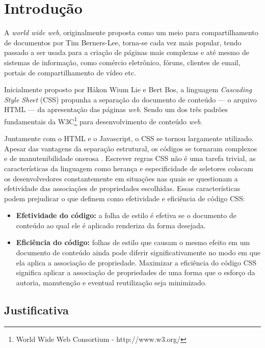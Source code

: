 \chapter{Introdução}
\label{chap:Intr}
A \textit{world wide web}, originalmente proposta como um meio para compartilhamento de
documentos por Tim Berners-Lee, torna-se cada vez mais popular, tendo passado a ser usada para a criação de páginas mais complexas e até mesmo de sistemas de informação, como comércio eletrônico, fóruns, clientes de email, portais de compartilhamento de vídeo etc.

Inicialmente proposto por Håkon Wium Lie e Bert Bos, a linguagem \textit{Cascading Style Sheet} (CSS) propunha a separação do documento de conteúdo --- o arquivo HTML --- da apresentação das páginas \textit{web}. Sendo um dos três padrões fundamentais da W3C\footnote{World Wide Web Consortium - http://www.w3.org/} para desenvolvimento de conteúdo \textit{web}.

Juntamente com o HTML e o Javascript, o CSS se tornou largamente utilizado. Apesar das vantagens da separação estrutural, os códigos se tornaram complexos e de manutenibilidade onerosa \cite{Mesbah2012}. Escrever regras CSS não é uma tarefa trivial, as características da linguagem como herança e especificidade de seletores colocam os desenvolvedores constantemente em situações nas quais se questionam a efetividade das associações de propriedades escolhidas. Essas características podem prejudicar o que  definem como efetividade e eficiência de código CSS:
\begin{itemize}
	\item\textbf{Efetividade do código:} a folha de estilo é efetiva se o documento de conteúdo ao qual ele é aplicado renderiza da forma desejada.
	
	\item\textbf{Eficiência do código:} folhas de estilo que causam o mesmo efeito em um documento de conteúdo ainda pode diferir significativamente no modo em que ela aplica a associação de propriedade. Maximizar a eficiência do código CSS significa aplicar a associação de propriedades de uma forma que o esforço da autoria, manutenção e eventual reutilização seja minimizado.
\end{itemize}

\section{Justificativa}

